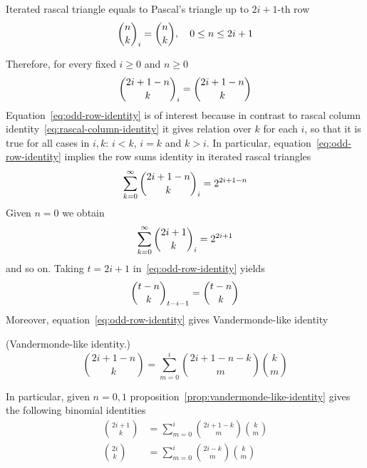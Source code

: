 \begin{proposition}
    \label{prop:odd-row-proposition}
    Iterated rascal triangle equals to Pascal's triangle up to $2i+1$-th row
    \begin{align*}
        \binom{n}{k}_{i} = \binom{n}{k}, \quad 0 \leq n \leq 2i+1
    \end{align*}
\end{proposition}
Therefore, for every fixed $i \geq 0$ and $n \geq 0$
\begin{equation}
    \binom{2i+1-n}{k}_{i} = \binom{2i+1-n}{k}
    \label{eq:odd-row-identity}
\end{equation}
Equation~\eqref{eq:odd-row-identity} is of interest because in contrast to rascal
column identity~\eqref{eq:rascal-column-identity} it gives relation over $k$ for each $i$,
so that it is true for all cases in $i,k$: $i < k$, $i=k$ and $k >i$.
In particular, equation~\eqref{eq:odd-row-identity} implies the row sums identity in iterated rascal triangles
\begin{align*}
    \sum_{k=0}^{\infty} \binom{2i+1-n}{k}_{i} = 2^{2i+1-n}
\end{align*}
Given $n=0$ we obtain
\begin{align*}
    \sum_{k=0}^{\infty} \binom{2i+1}{k}_{i} = 2^{2i+1}
\end{align*}
and so on.
Taking $t=2i+1$ in~\eqref{eq:odd-row-identity} yields
\begin{align*}
    \binom{t-n}{k}_{t-i-1}= \binom{t-n}{k}
\end{align*}
Moreover, equation~\eqref{eq:odd-row-identity} gives Vandermonde-like identity
\begin{proposition} (Vandermonde-like identity.)
    \label{prop:vandermonde-like-identity}
    \begin{equation*}
        \binom{2i+1-n}{k} = \sum_{m=0}^{i} \binom{2i+1-n-k}{m} \binom{k}{m}
    \end{equation*}
\end{proposition}
In particular, given $n=0,1$ proposition~\eqref{prop:vandermonde-like-identity}
gives the following binomial identities
\begin{align*}
    \binom{2i+1}{k} &= \sum_{m=0}^{i} \binom{2i+1-k}{m} \binom{k}{m} \\
    \binom{2i}{k}   &= \sum_{m=0}^{i} \binom{2i-k}{m} \binom{k}{m}
\end{align*}
